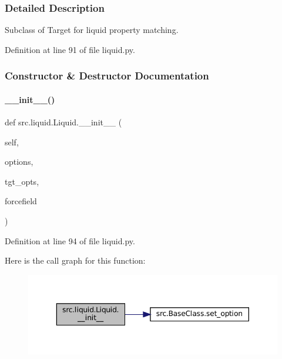 \subsubsection{Detailed Description}
Subclass of Target for liquid property matching. 



Definition at line 91 of file liquid.\+py.



\subsubsection{Constructor \& Destructor Documentation}
\mbox{\label{classsrc_1_1liquid_1_1Liquid_a218eb2c83f267c28251e4c85e9841182}} 
\paragraph{\texorpdfstring{\+\_\+\+\_\+init\+\_\+\+\_\+()}{\_\_init\_\_()}}
{\footnotesize\ttfamily def src.\+liquid.\+Liquid.\+\_\+\+\_\+init\+\_\+\+\_\+ (\begin{DoxyParamCaption}\item[{}]{self,  }\item[{}]{options,  }\item[{}]{tgt\+\_\+opts,  }\item[{}]{forcefield }\end{DoxyParamCaption})}



Definition at line 94 of file liquid.\+py.

Here is the call graph for this function\+:
\nopagebreak
\begin{figure}[H]
\begin{center}
\leavevmode
\includegraphics[width=350pt]{classsrc_1_1liquid_1_1Liquid_a218eb2c83f267c28251e4c85e9841182_cgraph}
\end{center}
\end{figure}


